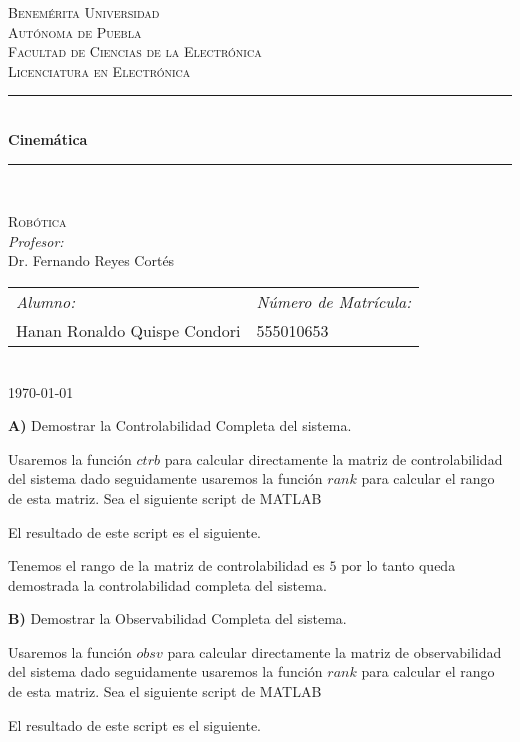 \documentclass[12pt]{article}
\date{\today}
\begin{document}
\begin{titlepage}
\newcommand{\HRule}{\rule{\linewidth}{0.5mm}} 
\center
\textsc{\LARGE  Benemérita Universidad \\[0.2cm] Autónoma de Puebla}\\[1.5cm] 
\textsc{\Large Facultad de Ciencias de la Electrónica}\\[0.5cm] 
\textsc{\large Licenciatura en Electrónica}\\[0.5cm]
\HRule \\[0.4cm]
{ \huge \bfseries Cinemática}\\[0.4cm] 
\HRule \\[1.5cm]
\begin{minipage}{\textwidth}
\center 
\textsc{\LARGE Robótica}\\[1.7cm] 
\emph{Profesor:} \\
Dr. Fernando Reyes Cortés \\[1cm]
\begin{tabular}{ll}
\emph{Alumno:} & \emph{Número de Matrícula:}\\
Hanan Ronaldo Quispe Condori  & 555010653\\
\end{tabular}
\end{minipage}\\[2cm]
\today
\end{titlepage}

\newpage

\textbf{A)} Demostrar la Controlabilidad Completa del sistema.
\vspace{10mm}

Usaremos la función $ctrb$ para calcular directamente la matriz de controlabilidad del sistema dado seguidamente usaremos la función $rank$ para calcular el rango de esta matriz.
Sea el siguiente script de MATLAB

El resultado de este script es el siguiente.


Tenemos el rango de la matriz de controlabilidad es $5$ por lo tanto queda demostrada la controlabilidad completa del sistema.
\vspace{10mm}

\textbf{B)} Demostrar la Observabilidad Completa del sistema.
\vspace{10mm}

Usaremos la función $obsv$ para calcular directamente la matriz de observabilidad del sistema dado seguidamente usaremos la función $rank$ para calcular el rango de esta matriz.
Sea el siguiente script de MATLAB

El resultado de este script es el siguiente.

\end{document}
